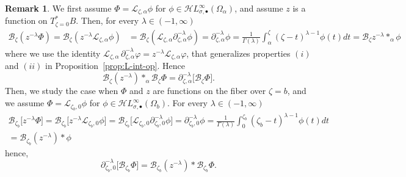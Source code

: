 \documentclass{article}
\newcommand{\singexp}[2]{\mathcal{H}L^\infty_{#1, #2}}
\newcommand{\singexpalg}[1]{\singexp{#1}{\bullet}}
\newcommand{\series}[1]{\tilde{#1}}
\newcommand{\fracderiv}[3]{\partial^{#1}_{#2, #3}}
\newcommand{\laplace}{\mathcal{L}}
\newcommand{\borel}{\mathcal{B}}
\theoremstyle{definition}
\newtheorem{remark}[definition]{Remark}
\theoremstyle{plain}
\begin{document}
\begin{remark}
We first assume $\Phi=\laplace_{\zeta,\alpha}\phi$ for $\phi\in\singexpalg{\sigma}(\Omega_\alpha)$, and assume $z$ is a function on $T^*_{\zeta=0}B$. Then, for every $\lambda\in (-1,\infty)$
\begin{align*}
    \borel_\zeta(z^{-\lambda}{\Phi})=\borel_\zeta(z^{-\lambda}\laplace_{\zeta,\alpha}\phi)&=\borel_\zeta(\laplace_{\zeta,\alpha}\partial_{\zeta,\alpha}^{-\lambda}\phi)=\partial_{\zeta,\alpha}^{-\lambda}\phi=\frac{1}{\Gamma(\lambda)}\int_{\alpha}^\zeta (\zeta-t)^{\lambda-1}\phi(t)dt=\borel_\zeta z^{-\lambda}\ast_\alpha\phi
\end{align*}
where we use the identity $\laplace_{\zeta, \alpha}\,\fracderiv{-\lambda}{\zeta}{\alpha} \varphi = z^{-\lambda} \laplace_{\zeta, \alpha} \varphi$, that generalizes properties $(i)$ and $(ii)$ in Proposition~\ref{prop:L-int-op}. Hence \[\borel_\zeta (z^{-\lambda})\ast_\alpha\borel_\zeta{\Phi}=\fracderiv{-\lambda}{\zeta}{\alpha}\big[\borel_\zeta\Phi\big].\]
Then, we study the case when $\Phi$ and $z$ are functions on the fiber over $\zeta=b$, and we assume $\Phi=\laplace_{\zeta_b,0}\phi$ for $\phi\in\singexpalg{\sigma}(\Omega_b)$. For every $\lambda\in (-1,\infty)$
\begin{multline*}
    \borel_{\zeta_b}\big[z^{-\lambda}\Phi\big]=\borel_{\zeta_b}\big[z^{-\lambda}\laplace_{\zeta_b,0}\phi\big]=\borel_{\zeta_b}\big[\laplace_{\zeta_b,0}\partial_{\zeta_b,0}^{-\lambda}\phi\big]=\partial_{\zeta_b,0}^{-\lambda}\phi=\frac{1}{\Gamma(\lambda)}\int_{0}^{\zeta_b} (\zeta_b-t)^{\lambda-1}\phi(t)dt\\
    =\borel_{\zeta_b}(z^{-\lambda})\ast\phi
\end{multline*}
hence,  \[\partial_{\zeta_b,0}^{-\lambda}\big[\borel_{\zeta_b}\Phi\big]=\borel_{\zeta_b} (z^{-\lambda})\ast\borel_{\zeta_b}{\Phi}.\]
\end{remark}
\end{document}
